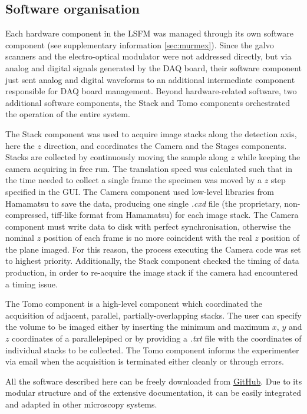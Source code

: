 \documentclass[12pt]{spieman}  %
\begin{document}
\begin{spacing}{2}
\subsection{Software organisation}
Each hardware component in the LSFM was managed through its own software component (see supplementary information \ref{sec:murmex}). Since the galvo scanners and the electro-optical modulator were not addressed directly, but via analog and digital signals generated by the DAQ board, their software component just sent analog and digital waveforms to an additional intermediate component responsible for DAQ board management. Beyond hardware-related software, two additional software components, the Stack and Tomo components orchestrated the operation of the entire system. 

The Stack component was used to acquire image stacks along the detection axis, here the $z$ direction, and coordinates the Camera and the Stages components. Stacks are collected by continuously moving the sample along $z$ while keeping the camera acquiring in free run. The translation speed was calculated such that in the time needed to collect a single frame the specimen was moved by a $z$ step specified in the GUI. The Camera component used low-level libraries from Hamamatsu to save the data, producing one single \emph{.cxd} file (the proprietary, non-compressed, tiff-like format from Hamamatsu) for each image stack. The Camera component must write data to disk with perfect synchronisation, otherwise the nominal $z$ position of each frame is no more coincident with the real $z$ position of the plane imaged. For this reason, the process executing the Camera code was set to highest priority. Additionally, the Stack component checked the timing of data production, in order to re-acquire the image stack if the camera had encountered a timing issue. 

The Tomo component is a high-level component which coordinated the acquisition of adjacent, parallel, partially-overlapping stacks. The user can specify the volume to be imaged either by inserting the minimum and maximum $x$, $y$ and $z$ coordinates of a parallelepiped or by providing a \textit{.txt} file with the coordinates of individual stacks to be collected. The Tomo component informs the experimenter via email when the acquisition is terminated either cleanly or through errors.

All the software described here can be freely downloaded from \href{https://github.com/marcelvanthoff/Giorgio}{GitHub}. Due to its modular structure and of the extensive documentation, it can be easily integrated and adapted in other microscopy systems.


\end{spacing}
\end{document}
